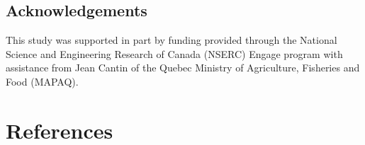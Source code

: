 \documentclass[authoryear]{elsarticle}
\begin{document}
\subsection{Acknowledgements}
This study was supported in part by funding provided through the
National Science and Engineering Research of Canada (NSERC) Engage
program with assistance from Jean Cantin of the Quebec Ministry of
Agriculture, Fisheries and Food (MAPAQ).

\section{References}

\end{document}
